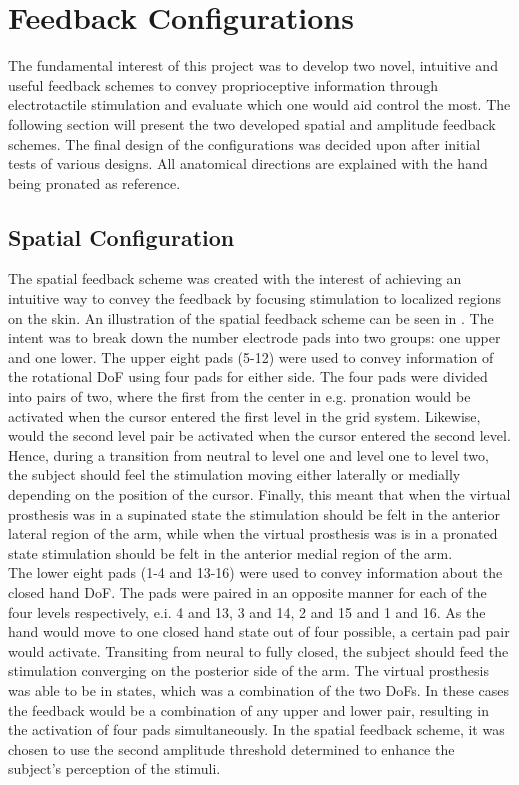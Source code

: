 \section{Feedback Configurations} \label{sec:feed}

The fundamental interest of this project was to develop two novel, intuitive and useful feedback schemes to convey proprioceptive information through electrotactile stimulation and evaluate which one would aid control the most. The following section will present the two developed spatial and amplitude feedback schemes. The final design of the configurations was decided upon after initial tests of various designs. All anatomical directions are explained with the hand being pronated as reference.      

\subsection{Spatial Configuration}

The spatial feedback scheme was created with the interest of achieving an intuitive way to convey the feedback by focusing stimulation to localized regions on the skin. An illustration of the spatial feedback scheme can be seen in . The intent was to break down the number electrode pads into two groups: one upper and one lower. The upper eight pads (5-12) were used to convey information of the rotational DoF using four pads for either side.  The four pads were divided into pairs of two, where the first from the center in e.g. pronation would be activated when the cursor entered the first level in the grid system. Likewise, would the second level pair be activated when the cursor entered the second level. Hence, during a transition from neutral to level one and level one to level two, the subject should feel the stimulation moving either laterally or medially depending on the position of the cursor. Finally, this meant that when the virtual prosthesis was in a supinated state the stimulation should be felt in the anterior lateral region of the arm, while when the virtual prosthesis was is in a pronated state stimulation should be felt in the anterior medial region of the arm.   \\
The lower eight pads (1-4 and 13-16) were used to convey information about the closed hand DoF. The pads were paired in an opposite manner for each of the four levels respectively, e.i. 4 and 13, 3 and 14, 2 and 15 and 1 and 16. As the hand would move to one closed hand state out of four possible, a certain pad pair would activate. Transiting from neural to fully closed, the subject should feed the stimulation converging on the posterior side of the arm. The virtual prosthesis was able to be in states, which was a combination of the two DoFs. In these cases the feedback would be a combination of any upper and lower pair, resulting in the activation of four pads simultaneously. In the spatial feedback scheme, it was chosen to use the second amplitude threshold determined to enhance the subject's perception of the stimuli. 

